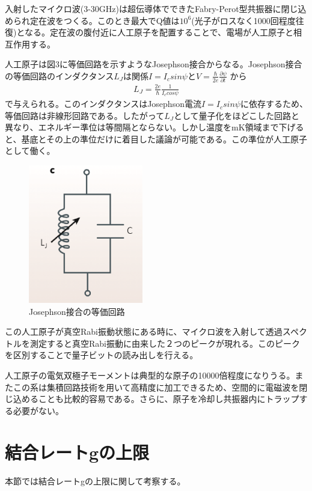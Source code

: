 \documentclass[11pt,a4paper]{jsarticle}
\begin{document}
入射したマイクロ波(3-30GHz)は超伝導体でできたFabry-Perot型共振器に閉じ込められ定在波をつくる。このとき最大でQ値は$10^6$(光子がロスなく1000回程度往復)となる。定在波の腹付近に人工原子を配置することで、電場が人工原子と相互作用する。

人工原子は図3に等価回路を示すようなJosephson接合からなる。Josephson接合の等価回路のインダクタンス$L_J$は関係$I=I_c sin\psi$と$V=\frac{\hbar}{2e}\frac{\partial \psi}{\partial t}$ から 
\begin{eqnarray}
L_J = \frac{2e}{\hbar} \frac{1}{I_c cos \psi}
\end{eqnarray}
で与えられる。このインダクタンスはJosephson電流$I=I_c sin\psi$に依存するため、等価回路は非線形回路である。したがって$L_J$として量子化をほどこした回路と異なり、エネルギー準位は等間隔とならない。しかし温度をmK領域まで下げると、基底とその上の準位だけに着目した議論が可能である。この準位が人工原子として働く。
\begin{figure}[htb]
    \begin{center}
   \includegraphics[width=50mm]{fig3.eps}
  \end{center}
  \caption{Josephson接合の等価回路}
\end{figure}

この人工原子が真空Rabi振動状態にある時に、マイクロ波を入射して透過スペクトルを測定すると真空Rabi振動に由来した２つのピークが現れる。このピークを区別することで量子ビットの読み出しを行える。

人工原子の電気双極子モーメントは典型的な原子の10000倍程度になりうる。またこの系は集積回路技術を用いて高精度に加工できるため、空間的に電磁波を閉じ込めることも比較的容易である。さらに、原子を冷却し共振器内にトラップする必要がない。

\appendix
\section{結合レートgの上限}
本節では結合レートgの上限に関して考察する。
\end{document}
